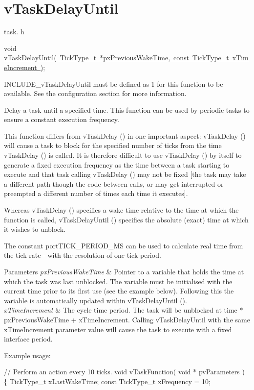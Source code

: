 \hypertarget{group__v_task_delay_until}{}\section{v\+Task\+Delay\+Until}
\label{group__v_task_delay_until}
task. h 
\begin{DoxyPre}void \mbox{\hyperlink{task_8h_a067da3e949e248096ec6c01f9cb75a47}{vTaskDelayUntil( TickType\_t *pxPreviousWakeTime, const TickType\_t xTimeIncrement )}};\end{DoxyPre}


I\+N\+C\+L\+U\+D\+E\+\_\+v\+Task\+Delay\+Until must be defined as 1 for this function to be available. See the configuration section for more information.

Delay a task until a specified time. This function can be used by periodic tasks to ensure a constant execution frequency.

This function differs from v\+Task\+Delay () in one important aspect\+: v\+Task\+Delay () will cause a task to block for the specified number of ticks from the time v\+Task\+Delay () is called. It is therefore difficult to use v\+Task\+Delay () by itself to generate a fixed execution frequency as the time between a task starting to execute and that task calling v\+Task\+Delay () may not be fixed \mbox{[}the task may take a different path though the code between calls, or may get interrupted or preempted a different number of times each time it executes\mbox{]}.

Whereas v\+Task\+Delay () specifies a wake time relative to the time at which the function is called, v\+Task\+Delay\+Until () specifies the absolute (exact) time at which it wishes to unblock.

The constant port\+T\+I\+C\+K\+\_\+\+P\+E\+R\+I\+O\+D\+\_\+\+MS can be used to calculate real time from the tick rate -\/ with the resolution of one tick period.


\begin{DoxyParams}{Parameters}
{\em px\+Previous\+Wake\+Time} & Pointer to a variable that holds the time at which the task was last unblocked. The variable must be initialised with the current time prior to its first use (see the example below). Following this the variable is automatically updated within v\+Task\+Delay\+Until ().\\
\hline
{\em x\+Time\+Increment} & The cycle time period. The task will be unblocked at time $\ast$px\+Previous\+Wake\+Time + x\+Time\+Increment. Calling v\+Task\+Delay\+Until with the same x\+Time\+Increment parameter value will cause the task to execute with a fixed interface period.\\
\hline
\end{DoxyParams}
Example usage\+: 
\begin{DoxyPre}
// Perform an action every 10 ticks.
void vTaskFunction( void * pvParameters )
\{
TickType\_t xLastWakeTime;
const TickType\_t xFrequency = 10;\end{DoxyPre}



